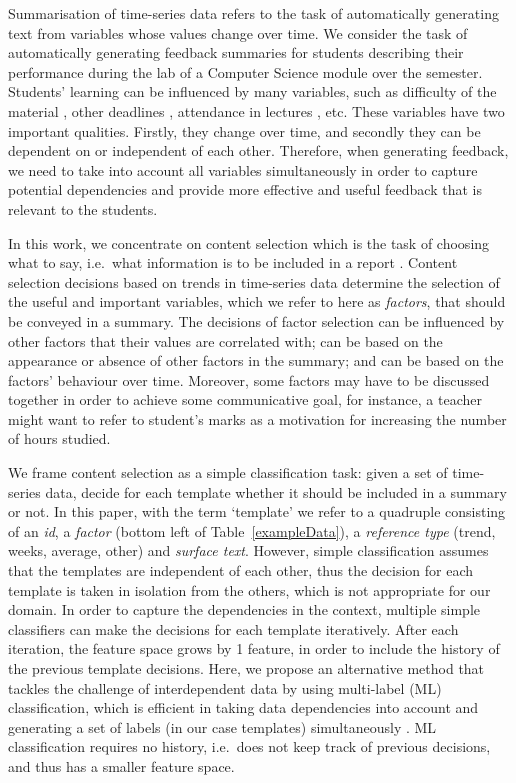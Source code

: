 \documentclass[11pt]{article}
\begin{document}
Summarisation of  time-series data refers to the task of automatically generating
 text from variables whose values change over time. We consider the task of automatically generating feedback summaries for students describing
their performance during the lab of a Computer Science module over the semester. 
Students' learning can be influenced by many variables, such as difficulty of the material \cite{Person1995},
 other deadlines \cite{Craig2004}, attendance in lectures \cite{Ames:1992}, etc. 
These variables have two important qualities. Firstly, they change over time, 
and secondly they can be dependent on or independent
of each other. Therefore, when generating feedback, we need to take into account all variables
simultaneously in order to capture potential dependencies and
 provide more effective and useful feedback that is relevant to the
 students. 

In this work, we concentrate on content selection which is the task of choosing what to say, i.e.\ what information is to be included in a report \cite{Reiter2000}.  
Content selection decisions based on trends in time-series data determine the selection of the 
useful and important variables, which we refer to here as \textit{factors}, that should be conveyed in a summary. The decisions of factor selection 
can be influenced by other factors that their values are correlated
with; can be based on the
 appearance or absence of other factors in the summary; and can be based on the factors' 
behaviour over time. Moreover, some factors may have to be discussed together
 in order to achieve some communicative goal, for instance, a teacher might want to refer to student's 
marks as a motivation for increasing the number of hours studied.

We frame content selection as a simple classification task: given a set of time-series data, 
decide for each template whether it should be included in a summary or
not. In this paper, with the term `template' we refer to a 
quadruple consisting of an {\it id}, a {\it factor} (bottom left of Table~\ref{exampleData}),
a {\it reference type} (trend, weeks, average, other) and {\it surface text}. However, simple classification
assumes that the templates are independent of each other, thus 
the decision for each template is taken in isolation from the others, which is
not appropriate for our domain. In order to capture the dependencies in the context, multiple simple classifiers can 
make the decisions for each template iteratively. After each iteration, the feature space grows by 1 feature,
 in order to include the history of the previous template decisions. 
Here, we propose an alternative method that tackles the challenge of interdependent data
 by using multi-label (ML) classification, 
which is efficient in taking data dependencies into account and generating a set of labels (in our case templates)
 simultaneously \cite{Tsoumakas:2007}. 
ML classification requires no history, i.e.\ does not keep track of
previous decisions, and thus has a smaller feature space. 
\end{document}

